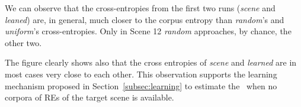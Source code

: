 We can observe that the cross-entropies from the first two runs (\emph{scene} and \emph{leaned}) are, in general, much closer to the corpus entropy than \emph{random}'s and \emph{uniform}'s cross-entropies.  Only in Scene 12 \emph{random} approaches, by chance, the other two. 

The figure clearly shows also that the cross entropies of \emph{scene} and \emph{learned} are in most cases very close to each other. This observation supports the learning mechanism proposed in Section~\ref{subsec:learning} to estimate the \puse\ when no corpora of REs of the target scene is available. 
